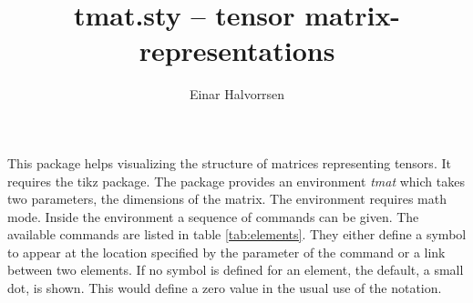 \documentclass[12pt,a4paper]{article}
\begin{document}
\title{tmat.sty -- tensor matrix-representations}
\author{Einar Halvorrsen}
\maketitle


This package helps visualizing the structure of matrices representing tensors. It requires the tikz package. The package provides an environment \textit{tmat} which takes two parameters, the dimensions of the matrix. The environment requires math mode. Inside the environment a sequence of commands can be given. The available commands are listed in table \ref{tab:elements}. They either define a symbol to appear at the location specified by the parameter of the command or a link between two elements. If no symbol is defined for an element, the default, a small dot, is shown. This would define a zero value in the usual use of the notation.   
\end{document}
